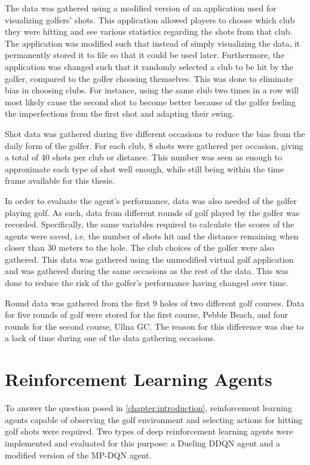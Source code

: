 \documentclass{kththesis}
\begin{document}
The data was gathered using a modified version of an application used for visualizing golfers' shots. This application allowed players to choose which club they were hitting and see various statistics regarding the shots from that club. The application was modified such that instead of simply visualizing the data, it permanently stored it to file so that it could be used later. Furthermore, the application was changed such that it randomly selected a club to be hit by the golfer, compared to the golfer choosing themselves. This was done to eliminate bias in choosing clubs. For instance, using the same club two times in a row will most likely cause the second shot to become better because of the golfer feeling the imperfections from the first shot and adapting their swing.

Shot data was gathered during five different occasions to reduce the bias from the daily form of the golfer. For each club, 8 shots were gathered per occasion, giving a total of 40 shots per club or distance. This number was seen as enough to approximate each type of shot well enough, while still being within the time frame available for this thesis. 

In order to evaluate the agent's performance, data was also needed of the golfer playing golf. As such, data from different rounds of golf played by the golfer was recorded. Specifically, the same variables required to calculate the scores of the agents were saved, i.e. the number of shots hit and the distance remaining when closer than 30 meters to the hole. The club choices of the golfer were also gathered. This data was gathered using the unmodified virtual golf application and was gathered during the same occasions as the rest of the data. This was done to reduce the risk of the golfer's performance having changed over time. 

Round data was gathered from the first 9 holes of two different golf courses. Data for five rounds of golf were stored for the first course, Pebble Beach, and four rounds for the second course, Ullna GC. The reason for this difference was due to a lack of time during one of the data gathering occasions.

\section{Reinforcement Learning Agents}
To answer the question posed in \autoref{chapter:introduction}, reinforcement learning agents capable of observing the golf environment and selecting actions for hitting golf shots were required. Two types of deep reinforcement learning agents were implemented and evaluated for this purpose: a Dueling DDQN agent and a modified version of the MP-DQN agent.
\end{document}
